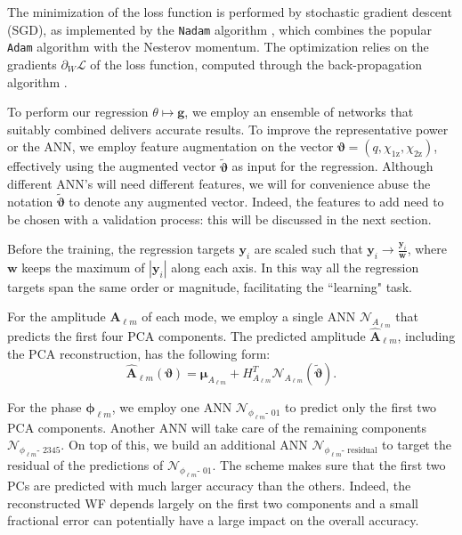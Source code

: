 \documentclass[twocolumn,showpacs,preprintnumbers,nofootinbib,prd,
superscriptaddress,10pt]{revtex4-2}
\begin{document}
The minimization of the loss function is performed by stochastic gradient descent (SGD), as implemented by the \texttt{Nadam} algorithm \cite{dozat.2016}, which combines the popular \texttt{Adam} algorithm \cite{Kingma2014AdamAM} with the Nesterov momentum. The optimization relies on the gradients $\partial_W \mathcal{L}$ of the loss function, computed through the 
back-propagation algorithm \cite{backprop}.

To perform our regression $\theta \longmapsto \boldsymbol{g}$, we employ an ensemble of networks that suitably combined delivers accurate results.
To improve the representative power or the ANN, we employ feature augmentation on the vector $\boldsymbol{\vartheta} = (q, \chi_\text{1z}, \chi_\text{2z})$, effectively using the augmented vector $\tilde{\boldsymbol{\vartheta}}$ as input for the regression. Although different ANN's will need different features, we will for convenience 
abuse the notation $\tilde{\boldsymbol{\vartheta}}$ to denote any augmented vector. Indeed, the features to add need to be chosen with a validation process: this will be discussed in the next section.

Before the training, the regression targets $\boldsymbol{y}_i$ are scaled such that $\boldsymbol{y}_i \rightarrow \frac{\boldsymbol{y}_i}{\boldsymbol{w}}$, where $\boldsymbol{w}$ keeps the maximum of $|\boldsymbol{y}_i|$ along each axis. %
In this way all the regression targets span the same order or magnitude, facilitating the ``learning" task.

For the amplitude $\boldsymbol{A}_{\ell m}$ of each mode, we employ a single ANN $\mathcal{N}_{A_{\ell m}}$ that predicts the first four PCA components.
The predicted amplitude $\hat{\boldsymbol{A}}_{\ell m}$, including the PCA reconstruction, has the following form:
\begin{equation}\label{eq:amp_pred}
	\hat{\boldsymbol{A}}_{\ell m}(\boldsymbol{\vartheta}) = \boldsymbol{\mu}_{A_{\ell m}} + H_{A_{\ell m}}^T \mathcal{N}_{A_{\ell m}}(\tilde{\boldsymbol{\vartheta}}).
\end{equation}

For the phase $\boldsymbol{\phi}_{\ell m}$, we employ one ANN $\mathcal{N}_{\phi_{\ell m}\text{- 01}}$ to predict only the first two PCA components.
Another ANN will take care of the remaining components $\mathcal{N}_{\phi_{\ell m}\text{- 2345}}$.
On top of this, we build an additional ANN $\mathcal{N}_{\phi_{\ell m}\text{- residual}}$ to target the residual of the predictions of $\mathcal{N}_{\phi_{\ell m}\text{- 01}}$.
The scheme makes sure that the first two PCs are predicted with much larger accuracy than the others. Indeed, the reconstructed WF depends largely on the first two components and a small fractional error can potentially have a large impact on the overall accuracy.
\end{document}

